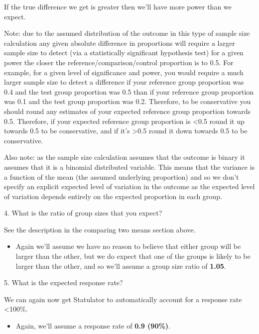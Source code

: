 \documentclass[
]{book}
\providecommand{\tightlist}{%
  \setlength{\itemsep}{0pt}\setlength{\parskip}{0pt}}
\begin{document}
If the true difference we get is greater then we'll have more power than we expect.

Note: due to the assumed distribution of the outcome in this type of sample size calculation any given absolute difference in proportions will require a larger sample size to detect (via a statistically significant hypothesis test) for a given power the closer the reference/comparison/control proportion is to 0.5. For example, for a given level of significance and power, you would require a much larger sample size to detect a difference if your reference group proportion was 0.4 and the test group proportion was 0.5 than if your reference group proportion was 0.1 and the test group proportion was 0.2. Therefore, to be conservative you should round any estimates of your expected reference group proportion towards 0.5. Therefore, if your expected reference group proportion is \textless0.5 round it up towards 0.5 to be conservative, and if it's \textgreater0.5 round it down towards 0.5 to be conservative.

Also note: as the sample size calculation assumes that the outcome is binary it assumes that it is a binomial distributed variable. This means that the variance is a function of the mean (the assumed underlying proportion) and so we don't specify an explicit expected level of variation in the outcome as the expected level of variation depends entirely on the expected proportion in each group.

4. What is the ratio of group sizes that you expect?

See the description in the comparing two means section above.

\begin{itemize}
\tightlist
\item
  Again we'll assume we have no reason to believe that either group will be larger than the other, but we do expect that one of the groups is likely to be larger than the other, and so we'll assume a group size ratio of \textbf{1.05}.
\end{itemize}

5. What is the expected response rate?

We can again now get Statulator to automatically account for a response rate \textless100\%.

\begin{itemize}
\tightlist
\item
  Again, we'll assume a response rate of \textbf{0.9 (90\%)}.
\end{itemize}
\end{document}
